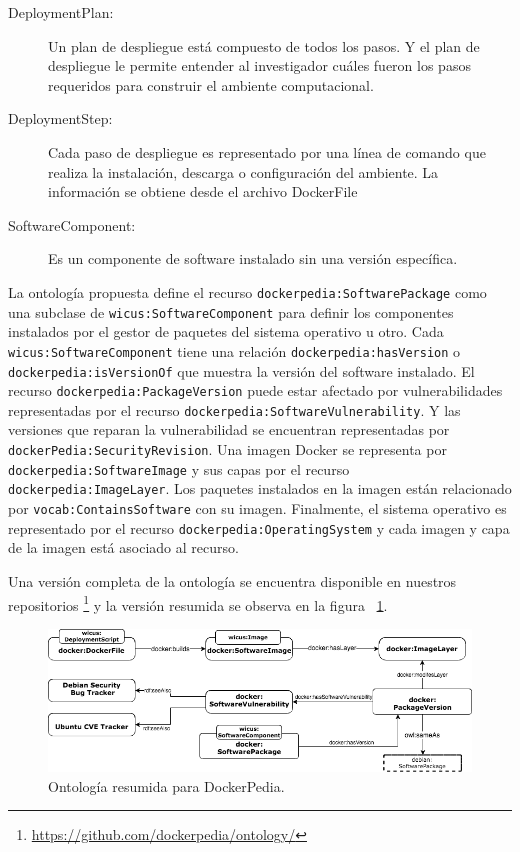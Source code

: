\begin{description}
	\item [DeploymentPlan:]  Un plan de despliegue está compuesto de todos los pasos. Y el plan de despliegue le permite entender al investigador cuáles fueron los pasos requeridos para construir el ambiente computacional.
	\item [DeploymentStep:] Cada paso de despliegue es representado por una línea de comando que realiza la instalación, descarga o configuración del ambiente. La información se obtiene desde el archivo DockerFile
	\item [SoftwareComponent:] Es un componente de software instalado sin una versión específica. 
\end{description} 

La ontología propuesta define el recurso \texttt{dockerpedia:SoftwarePackage} como una subclase de \texttt{wicus:SoftwareComponent} para definir los componentes instalados por el gestor de paquetes del sistema operativo u otro.
Cada \texttt{wicus:SoftwareComponent} tiene una relación \texttt{dockerpedia:hasVersion} o \texttt{dockerpedia:isVersionOf} que muestra la versión del software instalado.
El recurso \texttt{dockerpedia:PackageVersion} puede estar afectado por vulnerabilidades representadas por el recurso \texttt{dockerpedia:SoftwareVulnerability}. Y las versiones que reparan la vulnerabilidad se encuentran representadas por \texttt{dockerPedia:SecurityRevision}.
Una imagen Docker se representa por \texttt{dockerpedia:SoftwareImage} y sus capas por el recurso \texttt{dockerpedia:ImageLayer}. Los paquetes instalados en la imagen están relacionado por \texttt{vocab:ContainsSoftware} con su imagen.
Finalmente, el sistema operativo es representado por el recurso \texttt{dockerpedia:OperatingSystem} y cada imagen y capa de la imagen está asociado al recurso.

Una versión completa de la ontología se encuentra disponible en nuestros repositorios \footnote{\url{https://github.com/dockerpedia/ontology/}} y la versión resumida se observa en la figura ~\ref{fig:ontology}. 

\begin{figure}[t]
  \centering
    \includegraphics[width=1\textwidth]{Figures/dockerOntologyBasic.png}
      \caption{Ontología resumida para DockerPedia.}
     \label{fig:ontology}

\end{figure}

